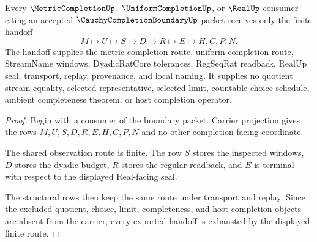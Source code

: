 \begin{theorem}
\label{thm:cauchy-completion-boundary-finite-handoff}
Every $\MetricCompletionUp$, $\UniformCompletionUp$, or $\RealUp$ consumer citing an accepted $\CauchyCompletionBoundaryUp$ packet receives only the finite handoff
$$
M \longmapsto U \longmapsto S \longmapsto D \longmapsto R \longmapsto E \longmapsto H,C,P,N .
$$
The handoff supplies the metric-completion route, uniform-completion route, StreamName windows, DyadicRatCore tolerances, RegSeqRat readback, RealUp seal, transport, replay, provenance, and local naming. It supplies no quotient stream equality, selected representative, selected limit, countable-choice schedule, ambient completeness theorem, or host completion operator.
\end{theorem}
\begin{proof}
Begin with a consumer of the boundary packet. Carrier projection gives the rows $M,U,S,D,R,E,H,C,P,N$ and no other completion-facing coordinate.

The shared observation route is finite. The row $S$ stores the inspected windows, $D$ stores the dyadic budget, $R$ stores the regular readback, and $E$ is terminal with respect to the displayed Real-facing seal.

The structural rows then keep the same route under transport and replay. Since the excluded quotient, choice, limit, completeness, and host-completion objects are absent from the carrier, every exported handoff is exhausted by the displayed finite route.
\end{proof}


\begin{closurestatus}{\CauchyCompletionBoundaryUp}
  \theoryclosure{\seedClosure}
  \formalstatus{\unformalizedV}
\end{closurestatus}
